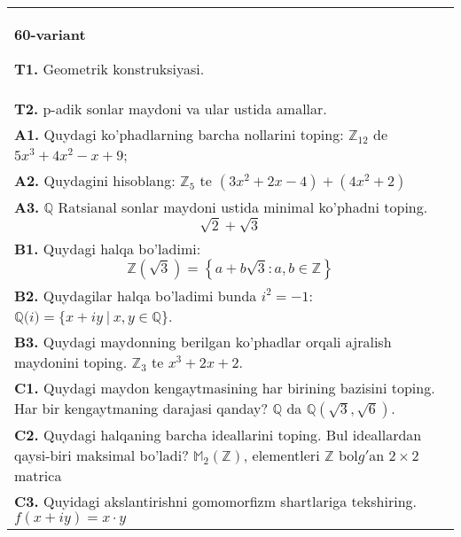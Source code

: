 \documentclass{article}
\begin{document}
\begin{tabular}{m{17cm}}
\textbf{60-variant}
\newline

\textbf{T1.} Geometrik konstruksiyasi. \\
\textbf{T2.} p-adik sonlar maydoni va ular ustida amallar. \\
\textbf{A1.} Quydagi ko'phadlarning barcha nollarini toping:
\(\mathbb{Z}_{12}\) de \(5x^{3} + 4x^{2} - x + 9\); \\
\textbf{A2.} Quydagini hisoblang:
\(\mathbb{Z}_{5}\) te \(\left( 3x^{2} + 2x - 4 \right) + \left( 4x^{2} + 2 \right)\) \\
\textbf{A3.} \(\mathbb{Q}\) Ratsianal sonlar maydoni ustida minimal ko'phadni toping.
\[\sqrt{2} + \sqrt{3}\] \\
\textbf{B1.} Quydagi halqa bo'ladimi:
\[\mathbb{Z}\left( \sqrt{3} \right) = \left\{ a + b\sqrt{3}:a,b \in \mathbb{Z} \right\}\] \\
\textbf{B2.} Quydagilar halqa bo'ladimi bunda \(i^{2} = - 1\):
\(\mathbb{Q(}i) = \{ x + iy\ |\ x,y \in \mathbb{Q\}}\). \\
\textbf{B3.} Quydagi maydonning berilgan ko'phadlar orqali ajralish maydonini toping.
\(\mathbb{Z}_{3}\) te \(x^{3} + 2x + 2\). \\
\textbf{C1.} Quydagi maydon kengaytmasining har birining bazisini toping. Har bir kengaytmaning darajasi qanday?
\(\mathbb{Q}\) da \(\mathbb{Q}\left( \sqrt{3},\sqrt{6} \right)\). \\
\textbf{C2.} Quydagi halqaning barcha ideallarini toping. Bul ideallardan qaysi-biri maksimal bo'ladi?
\(\mathbb{M}_{2}\left( \mathbb{Z} \right)\), elementleri \(\mathbb{Z}\) bol\(g'\)an \(2 \times 2\) matrica \\
\textbf{C3.} Quyidagi akslantirishni gomomorfizm shartlariga tekshiring. \(f(x + iy) = x \cdot y\) \\

\end{tabular}
\vspace{1cm}
\end{document}
